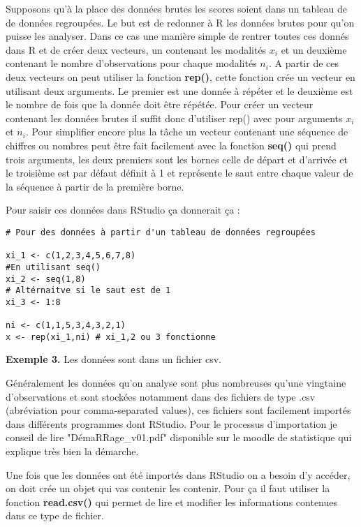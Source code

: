 \documentclass{report}
\begin{document}
Supposons qu'à la place des données brutes les scores soient dans un tableau de de données regroupées. Le but est de redonner à R les données brutes pour qu'on puisse les analyser. Dans ce cas une manière simple de rentrer toutes ces donnés dans R et de créer deux vecteurs, un contenant les modalités $x_i$ et un deuxième contenant le nombre d'observations pour chaque modalités $n_i$. A partir de ces deux vecteurs on peut utiliser la fonction \textbf{rep()}, cette fonction crée un vecteur en utilisant deux arguments. Le premier est une donnée à répéter et le deuxième est le nombre de fois que la donnée doit être répétée. Pour créer un vecteur contenant les données brutes il suffit donc d'utiliser rep() avec pour arguments $x_i$ et $n_i$. Pour simplifier encore plus la tâche un vecteur contenant une séquence de chiffres ou nombres peut être fait facilement avec la fonction \textbf{seq()} qui prend trois arguments, les deux premiers sont les bornes celle de départ et d'arrivée et le troisième est par défaut définit à 1 et représente le saut entre chaque valeur de la séquence à partir de la première borne.

Pour saisir ces données dans RStudio ça donnerait ça :

\begin{verbatim}
# Pour des données à partir d'un tableau de données regroupées 

xi_1 <- c(1,2,3,4,5,6,7,8)
#En utilisant seq()
xi_2 <- seq(1,8)
# Altérnaitve si le saut est de 1
xi_3 <- 1:8

ni <- c(1,1,5,3,4,3,2,1)
x <- rep(xi_1,ni) # xi_1,2 ou 3 fonctionne
\end{verbatim}

\textbf{Exemple 3.} Les données sont dans un fichier csv. 

Généralement les données qu'on analyse sont plus nombreuses qu'une vingtaine d'observations et sont stockées notamment dans des fichiers de type .csv (abréviation pour comma-separated values), ces fichiers sont facilement importés dans différents programmes dont RStudio. Pour le processus d'importation je conseil de lire "DémaRRage\_v01.pdf" disponible sur le moodle de statistique qui explique très bien la démarche.

Une fois que les données ont été importés dans RStudio on a besoin d'y accéder, on doit crée un objet qui vas contenir les contenir. Pour ça il faut utiliser la fonction \textbf{read.csv()} qui permet de lire et modifier les informations contenues dans ce type de fichier.
\end{document}
